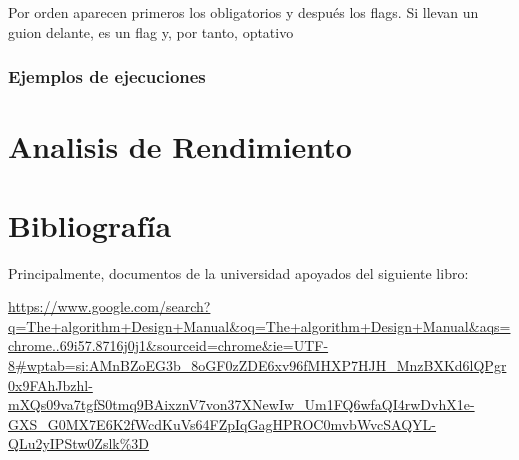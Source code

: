 \documentclass[a4paper, 12.5pt]{report}
\begin{document}
Por orden aparecen primeros los obligatorios y después los flags. Si llevan un guion delante, es un flag y, por tanto, optativo

\subsubsection{Ejemplos de ejecuciones}


\section{Analisis de Rendimiento}


\section{Bibliografía}

Principalmente, documentos de la universidad apoyados del siguiente libro:

\url{https://www.google.com/search?q=The+algorithm+Design+Manual&oq=The+algorithm+Design+Manual&aqs=chrome..69i57.8716j0j1&sourceid=chrome&ie=UTF-8#wptab=si:AMnBZoEG3b_8oGF0zZDE6xv96fMHXP7HJH_MnzBXKd6lQPgr0x9FAhJbzhl-mXQs09va7tgfS0tmq9BAixznV7von37XNewIw_Um1FQ6wfaQI4rwDvhX1e-GXS_G0MX7E6K2fWcdKuVs64FZpIqGagHPROC0mvbWvcSAQYL-QLu2yIPStw0Zslk%3D}
\end{document}
